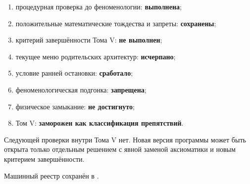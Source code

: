 \begin{protocol}
\begin{enumerate}
 \item процедурная проверка до феноменологии: \textbf{выполнена};
 \item положительные математические тождества и запреты:
 \textbf{сохранены};
 \item критерий завершённости Тома V: \textbf{не выполнен};
 \item текущее меню родительских архитектур: \textbf{исчерпано};
 \item условие ранней остановки: \textbf{сработало};
 \item феноменологическая подгонка: \textbf{запрещена};
 \item физическое замыкание: \textbf{не достигнуто};
 \item Том V: \textbf{заморожен как классификация препятствий}.
\end{enumerate}
\end{protocol}

Следующей проверки внутри Тома V нет. Новая версия программы может быть
открыта только отдельным решением с явной заменой аксиоматики и новым
критерием завершённости.

Машинный реестр сохранён в
.